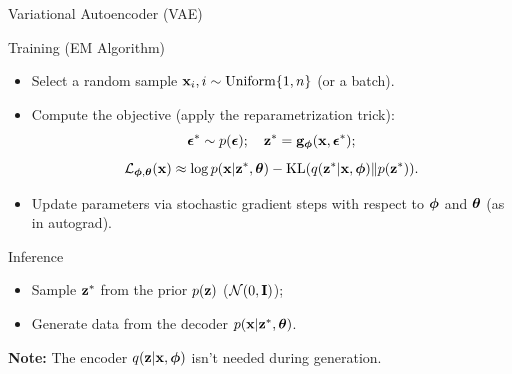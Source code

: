 \documentclass{beamer}
\begin{document}
\begin{frame}{Variational Autoencoder (VAE)}
	\begin{block}{Training (EM Algorithm)}
		\begin{itemize}
			\item Select a random sample $\mathbf{x}_i, i \sim \text{Uniform}\{1, n\}$ (or a batch).
			\eqpause
			\item Compute the objective (apply the reparametrization trick):
			\vspace{-0.3cm}
			\[
				\boldsymbol{\epsilon}^* \sim p(\boldsymbol{\epsilon}); \quad \mathbf{z}^* = \mathbf{g}_{\boldsymbol{\phi}}(\mathbf{x}, \boldsymbol{\epsilon}^*);
			\]
			\[
				\mathcal{L}_{\boldsymbol{\phi}, \boldsymbol{\theta}}(\mathbf{x}) \approx  \log p(\mathbf{x} | \mathbf{z}^*, \boldsymbol{\theta}) - \mathrm{KL}(q(\mathbf{z}^* | \mathbf{x}, \boldsymbol{\phi}) \| p(\mathbf{z}^*)).
			\]
			\eqpause
			\vspace{-0.5cm}
			\item Update parameters via stochastic gradient steps with respect to $\boldsymbol{\phi}$ and $\boldsymbol{\theta}$ (as in autograd).
		\end{itemize}
	\end{block}
	\eqpause
	\begin{block}{Inference}
		\begin{itemize}
			\item Sample $\mathbf{z}^*$ from the prior $p(\mathbf{z})$ ($\mathcal{N}(0, \mathbf{I})$);
			\eqpause
			\item Generate data from the decoder $p(\mathbf{x} | \mathbf{z}^*, \boldsymbol{\theta})$.
		\end{itemize}
	\end{block}
	\eqpause
	\textbf{Note:} The encoder $q(\mathbf{z} | \mathbf{x}, \boldsymbol{\phi})$ isn't needed during generation.
\end{frame}
\end{document}
